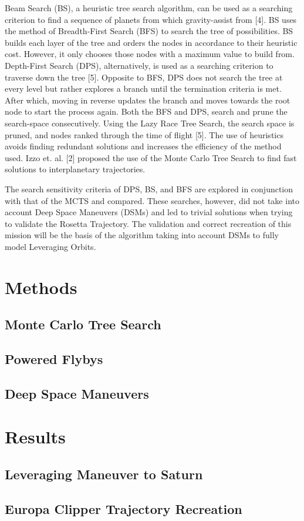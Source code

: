 \documentclass[letterpaper, preprint, paper,11pt]{AAS}	%
\begin{document}
Beam Search (BS), a heuristic tree search algorithm, can be used as a searching criterion to find a sequence of planets from which gravity-assist from [4]. BS uses the method of Breadth-First Search (BFS) to search the tree of possibilities. BS builds each layer of the tree and orders the nodes in accordance to their heuristic cost. However, it only chooses those nodes with a maximum value to build from. Depth-First Search (DPS), alternatively, is used as a searching criterion to traverse down the tree [5]. Opposite to BFS, DPS does not search the tree at every level but rather explores a branch until the termination criteria is met. After which, moving in reverse updates the branch and moves towards the root node to start the process again. Both the BFS and DPS, search and prune the search-space consecutively. Using the Lazy Race Tree Search, the search space is pruned, and nodes ranked through the time of flight [5]. The use of heuristics avoids finding redundant solutions and increases the efficiency of the method used. Izzo et. al. [2] proposed the use of the Monte Carlo Tree Search to find fast solutions to interplanetary trajectories. 

The search sensitivity criteria of DPS, BS, and BFS are explored in conjunction with that of the MCTS and compared. These searches, however, did not take into account Deep Space Maneuvers (DSMs) and led to trivial solutions when trying to validate the Rosetta Trajectory. The validation and correct recreation of this mission will be the basis of the algorithm taking into account DSMs to fully model Leveraging Orbits.

\section{Methods}

\subsection{Monte Carlo Tree Search}

\subsection{Powered Flybys}

\subsection{Deep Space Maneuvers}

\section{Results}

\subsection{Leveraging Maneuver to Saturn}

\subsection{Europa Clipper Trajectory Recreation}
\end{document}
